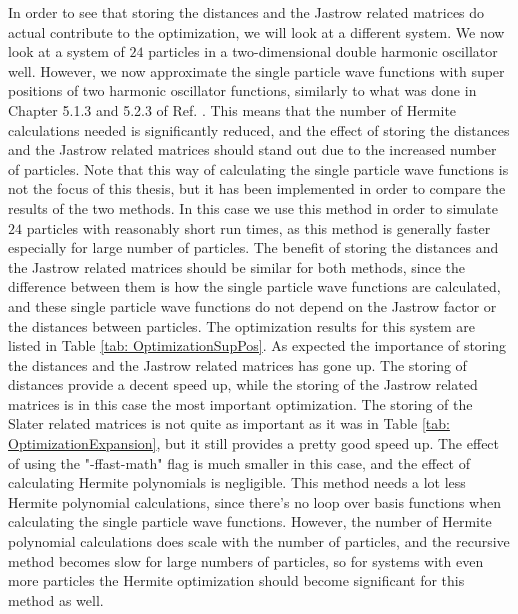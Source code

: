 \documentclass[../main.tex]{subfiles}
\begin{document}
In order to see that storing the distances and the Jastrow related matrices do actual contribute to the optimization, we will look at a different system. We now look at a system of $24$ particles in a two-dimensional double harmonic oscillator well. However, we now approximate the single particle wave functions with super positions of two harmonic oscillator functions, similarly to what was done in Chapter 5.1.3 and 5.2.3 of Ref. \cite{Jorgen}. This means that the number of Hermite calculations needed is significantly reduced, and the effect of storing the distances and the Jastrow related matrices should stand out due to the increased number of particles. Note that this way of calculating the single particle wave functions is not the focus of this thesis, but it has been implemented in order to compare the results of the two methods. In this case we use this method in order to simulate $24$ particles with reasonably short run times, as this method is generally faster especially for large number of particles. The benefit of storing the distances and the Jastrow related matrices should be similar for both methods, since the difference between them is how the single particle wave functions are calculated, and these single particle wave functions do not depend on the Jastrow factor or the distances between particles. The optimization results for this system are listed in Table \ref{tab: OptimizationSupPos}. As expected the importance of storing the distances and the Jastrow related matrices has gone up. The storing of distances provide a decent speed up, while the storing of the Jastrow related matrices is in this case the most important optimization. The storing of the Slater related matrices is not quite as important as it was in Table \ref{tab: OptimizationExpansion}, but it still provides a pretty good speed up. The effect of using the "-ffast-math" flag is much smaller in this case, and the effect of calculating Hermite polynomials is negligible. This method needs a lot less Hermite polynomial calculations, since there's no loop over basis functions when calculating the single particle wave functions. However, the number of Hermite polynomial calculations does scale with the number of particles, and the recursive method becomes slow for large numbers of particles, so for systems with even more particles the Hermite optimization should become significant for this method as well.
\end{document}
